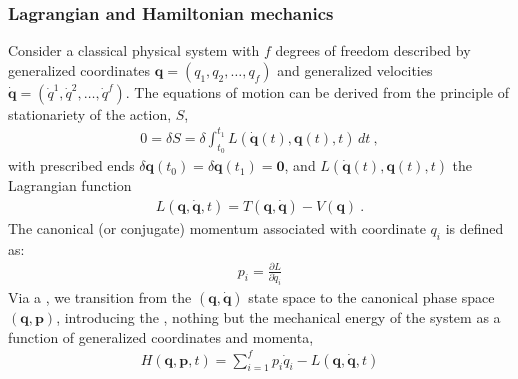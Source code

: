 \documentclass[letterpaper,10pt,english]{jupyterBook}
\begin{document}
\subsubsection{Lagrangian and Hamiltonian mechanics}
\label{\detokenize{ch/quantum-mechanics/atom-models/analytical-mechanics-short:lagrangian-and-hamiltonian-mechanics}}\label{\detokenize{ch/quantum-mechanics/atom-models/analytical-mechanics-short:analytical-mechanics-short-lagrange-hamilton}}
\sphinxAtStartPar
{} Consider a classical physical system with \(f\) degrees of freedom described by generalized coordinates \(\mathbf{q} = (q_1, q_2, \dots, q_f)\) and generalized velocities \(\mathbf{\dot{q}} = (\dot{q}^1, \dot{q}^2, \dots, \dot{q}^f)\). The equations of motion can be derived from the principle of stationariety of the action, \(S\),
\begin{equation*}
\begin{split}0 = \delta S = \delta \int_{t_0}^{t_1} L \left( \dot{\mathbf{q}}(t), \mathbf{q}(t), t \right) \, dt \ ,\end{split}
\end{equation*}
\sphinxAtStartPar
with prescribed ends \(\delta \mathbf{q}(t_0) = \delta \mathbf{q}(t_1) = \mathbf{0}\), and \(L(\dot{\mathbf{q}}(t), \mathbf{q}(t), t)\) the Lagrangian function
\begin{equation*}
\begin{split}
  L(\mathbf{q}, \mathbf{\dot{q}}, t) = T(\mathbf{q}, \mathbf{\dot{q}}) - V(\mathbf{q}) \ .
\end{split}
\end{equation*}
\sphinxAtStartPar
The canonical (or conjugate) momentum associated with coordinate \(q_i\) is defined as:
\begin{equation*}
\begin{split}
p_i = \frac{\partial L}{\partial \dot{q}_i}
\end{split}
\end{equation*}
\sphinxAtStartPar
{} Via a , we transition from the \((\mathbf{q}, \mathbf{\dot{q}})\) state space to the canonical phase space \((\mathbf{q}, \mathbf{p})\), introducing the , nothing but the mechanical energy of the system as a function of generalized coordinates and momenta,
\begin{equation*}
\begin{split}
H(\mathbf{q}, \mathbf{p}, t) = \sum_{i=1}^f p_i \dot{q}_i - L(\mathbf{q}, \mathbf{\dot{q}}, t)
\end{split}
\end{equation*}
\end{document}

